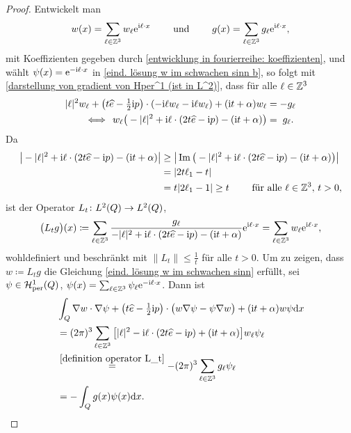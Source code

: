 \begin{proof}
	Entwickelt man
	\begin{equation*}
		w(x)=\sum_{\ell\in\mathbb{Z}^3}w_\ell\mathrm{e}^{\mathrm{i}\ell\cdot x}\qquad\text{ und }\qquad g(x)=\sum_{\ell\in\mathbb{Z}^3}g_\ell\mathrm{e}^{\mathrm{i}\ell\cdot x},
	\end{equation*}
	mit Koeffizienten gegeben durch \eqref{entwicklung in fourierreihe: koeffizienten}, und wählt \(\psi(x)=\mathrm{e}^{-\mathrm{i}\ell\cdot x}\) in \eqref{eind. lösung w im schwachen sinn b}, so folgt mit \eqref{darstellung von gradient von Hper^1 (ist in L^2)}, dass für alle \(\ell\in\mathbb{Z}^3\)
	\begin{align*}
		|\ell|^2w_\ell+\big(t\widehat{e}-\tfrac{1}{2}\mathrm{i} p\big)\cdot(-\mathrm{i}\ell w_\ell-\mathrm{i}\ell w_\ell)+(\mathrm{i} t+\alpha)w_\ell&=-g_\ell\\
		\Longleftrightarrow\,\;w_\ell\big(-|\ell|^2+\mathrm{i}\ell\cdot(2t\widehat{e}-\mathrm{i} p)-(\mathrm{i} t+\alpha)\big)&=\;g_\ell.
	\end{align*}
	Da
	\begin{align*}
		\big|-|\ell|^2+\mathrm{i}\ell\cdot(2t\widehat{e}-\mathrm{i} p)-(\mathrm{i} t+\alpha)\big|
		&\geq\big|\operatorname{Im}\big(-|\ell|^2+\mathrm{i}\ell\cdot(2t\widehat{e}-\mathrm{i} p)-(\mathrm{i} t+\alpha)\big)\big|\\
		&=|2t\ell_1-t|\\
		&=t|2\ell_1-1|\geq t\qquad\text{ für alle }\ell\in\mathbb{Z}^3,\,t>0,
	\end{align*}
	ist der Operator \(L_t\colon L^2(Q) \to L^2(Q)\),
	\begin{equation}
		\label{definition operator L_t}
		\big(L_tg\big)(x)\coloneqq\sum_{\ell\in\mathbb{Z}^3}\frac{g_\ell}{-|\ell|^2+\mathrm{i}\ell\cdot(2t\widehat{e}-\mathrm{i} p)-(\mathrm{i} t+\alpha)}\mathrm{e}^{\mathrm{i}\ell\cdot x} =\sum_{\ell\in\mathbb{Z}^3}w_\ell\mathrm{e}^{\mathrm{i}\ell\cdot x},
	\end{equation}
	wohldefiniert und beschränkt mit \(\|L_t\|\leq\frac{1}{t}\) für alle \(t>0\). Um zu zeigen, dass \(w\coloneqq L_tg\) die Gleichung \eqref{eind. lösung w im schwachen sinn} erfüllt, sei \(\psi\in\mathcal{H}_{\mathrm{per}}^1(Q)\), \(\psi(x)=\sum_{\ell\in\mathbb{Z}^3}\psi_\ell\mathrm{e}^{-\mathrm{i}\ell\cdot x}\). Dann ist
	\begin{align*}
		&\int_Q\nabla w\cdot\nabla\psi+\big(t\widehat{e}-\tfrac{1}{2}\mathrm{i} p\big)\cdot\big(w\nabla\psi-\psi\nabla w\big)+(\mathrm{i} t+\alpha)w\psi\mathrm{d}x\\
		&=(2\pi)^3\sum_{\ell\in\mathbb{Z}^3}\big[|\ell|^2-\mathrm{i}\ell\cdot(2t\widehat{e}-\mathrm{i} p)+(\mathrm{i} t+\alpha)\big]w_\ell\psi_\ell\\
		&\overset{\eqref{definition operator L_t}}{=}-(2\pi)^3\sum_{\ell\in\mathbb{Z}^3}g_\ell\psi_\ell\\
		&=-\int_Qg(x)\psi(x)\mathrm{d}x.
	\end{align*}
\end{proof}
